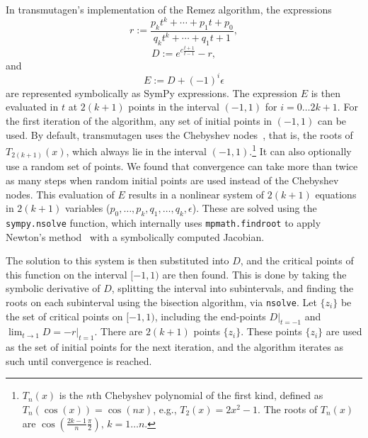 In transmutagen's implementation of the Remez algorithm, the expressions
\begin{equation}
  r := \frac{p_kt^k + \cdots + p_1t + p_0}{q_kt^k + \cdots +
    q_1t + 1},
\end{equation}
\begin{equation}
  D := e^{c\frac{t+1}{t-1}} - r,
\end{equation}
and
\begin{equation}
  E := D + (-1)^i\epsilon
\end{equation}
are represented symbolically as SymPy expressions. The expression $E$ is then
evaluated in $t$ at $2(k + 1)$ points in the interval $(-1, 1)$ for
$i=0\ldots 2k+1$. For the first iteration of the algorithm, any set of initial
points in $(-1, 1)$ can be used. By default, transmutagen uses the Chebyshev
nodes~\cite{ationneeded}, that is, the roots of $T_{2(k +1)}(x)$, which always
lie in the interval $(-1, 1)$.\footnote{$T_n(x)$ is the $n$th Chebyshev
  polynomial of the first kind, defined as $T_n(\cos(x)) = \cos(nx)$, e.g.,
  $T_2(x) = 2x^2 - 1$. The roots of $T_n(x)$ are
  $\cos{\left (\frac{2k - 1}{n}\frac{\pi}{2} \right )},\,k=1\ldots n$.} It can
also optionally use a random set of points. We found that convergence can take
more than twice as many steps when random initial points are used instead of
the Chebyshev nodes.  This evaluation of $E$ results in a
nonlinear system of $2(k+1)$ equations in $2(k+1)$ variables
($p_0,\ldots,p_k,q_1,\ldots,q_k,\epsilon$). These are solved using the
\texttt{sympy.nsolve} function, which internally uses \texttt{mpmath.findroot}
to apply Newton's method~\cite{ationneeded} with a symbolically computed
Jacobian.

\label{sec:nsolve-bisection}
The solution to this system is then substituted into $D$, and the critical
points of this function on the interval $[-1, 1)$ are then found. This is done
by taking the symbolic derivative of $D$, splitting the interval into
subintervals, and finding the roots on each subinterval using the bisection
algorithm, via \texttt{nsolve}. Let $\{z_i\}$ be the set of critical points on
$[-1, 1)$, including the end-points $D|_{t=-1}$ and
$\lim_{t\to 1} D=-r|_{t=1}$. There are $2(k+1)$ points $\{z_i\}$. These points
$\{z_i\}$ are used as the set of initial points for the next iteration, and
the algorithm iterates as such until convergence is reached.

